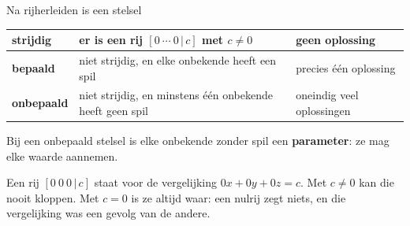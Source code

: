 \begin{theorie}
Na rijherleiden is een stelsel

\vspace{1mm}
{\centering{}\renewcommand{\arraystretch}{1.5}%
\begin{tabular}{|>{\centering\arraybackslash}m{2.5cm}|>{\centering\arraybackslash}m{6.6cm}|>{\centering\arraybackslash}m{4.2cm}|}
\hline
\textbf{\textcolor{accent}{strijdig}} & er is een rij $[0 \ \cdots \ 0 \,|\, c]$ met $c \neq 0$ & geen oplossing \\ \hline
\textbf{\textcolor{accent}{bepaald}} & niet strijdig, en elke onbekende heeft een spil & precies één oplossing \\ \hline
\textbf{\textcolor{accent}{onbepaald}} & niet strijdig, en minstens één onbekende heeft geen spil & oneindig veel oplossingen \\ \hline
\end{tabular}\par}

\vspace{1mm}
Bij een onbepaald stelsel is elke onbekende zonder spil een \textbf{\textcolor{accent}{parameter}}: ze mag elke waarde aannemen.
\end{theorie}

Een rij $[0 \ 0 \ 0 \,|\, c]$ staat voor de vergelijking $0x + 0y + 0z = c$. Met $c \neq 0$ kan die nooit kloppen. Met $c = 0$ is ze altijd waar: een nulrij zegt niets, en die vergelijking was een gevolg van de andere.

